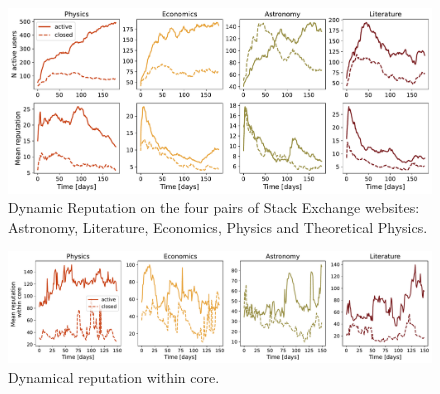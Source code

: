 


\begin{figure}[h]
	\centering
	\includegraphics[width=\linewidth]{figures/stackexchange/reputation.pdf}
	\caption{Dynamic Reputation on the four pairs of Stack Exchange websites: Astronomy, Literature, Economics,  Physics and Theoretical Physics.}
	\label{fig:dr6panel}
\end{figure}

\begin{figure}[h]
	\centering
	\includegraphics[width=\linewidth]{figures/stackexchange/core_reputation.pdf}
	\caption{Dynamical reputation within core.}
	\label{fig:dr_core}
\end{figure}


